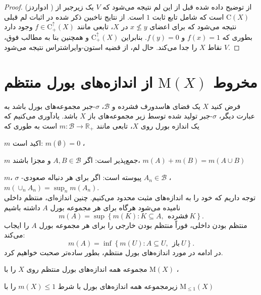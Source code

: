 \documentclass[12pt,a4paper]{article}
\theoremstyle{definition}
\theoremstyle{theorem}
\theoremstyle{definition}
\newcommand{\rM}{\mathrm{M}}
\newcommand{\rC}{\mathrm{C}}
\begin{document}
\begin{proof}
 (ادواردز%
\cite{D.A. Edwards}%
) از توضیح داده شده قبل از این لم نتیجه می‌شود که 
$ V $
یک زیرجبر از 
$ \rC(X) $
است که شامل تابع  ثابت 
$ 1 $
است. از نتایج ناخبین
 ذکر شده در اثبات لم قبلی نتیجه می‌شود که برای اعضای 
$ x\nleq y $
در
$ X $،  تابعی مانند
$ f\in \rC_{+}^{\uparrow} (X) $
وجود دارد 
بطوری که 
$ f(x)=1 $
و
$ f(y)=0$. بنابراین 
$ \rC_{+}^{\uparrow} (X) $
و همچنین بنا به مطالب فوق، 
$ V $
نقاط 
$ X $
را جدا می‌کند.  حال لم،  از قضیه استون-وایراشتراس
 نتیجه می‌شود.
\end{proof}

\section{ مخروط $\rM(X)$ از اندازه‌های بورل منتظم}\label{2} 
فرض کنید 
$ X $
یک فضای هاسدورف فشرده و
$ \mathcal{B} $، 
$ \sigma $-جبر مجموعه‌های بورل باشد به عبارت دیگر، 
$ \sigma $-جبر تولید شده توسط زیر مجموعه‌های باز 
$ X $
باشد. یادآوری می‌کنیم که یک اندازه بورل
 روی
$ X $،    تابعی مانند 
$ m:\mathcal{B} \rightarrow \mathbb{R}_{+} $
است به طوری که 

$ m $
اکید است:
$ m(\emptyset)=0 $%
،

$ m $
جمع‌پذیر است: اگر 
$ A,B\in \mathcal{B} $
و مجزا باشند،
$ m(A)+m(B)=m(A\cup B) $


$ m $،
$ \sigma $%
-پیوسته است: اگر برای هر دنباله صعودی 
$ A_{n}\in \mathcal{B}$%
،
$ m(\cup_{n} A_{n})=\sup_{n} m(A_{n}) $.\\
توجه داریم که  خود را به اندازه‌های مثبت محدود می‌کنیم.  چنین اندازه‌ای، منتظم داخلی
 نامیده می‌شود هرگاه برای هر مجموعه‌ بورل 
$ A $
داشته باشیم
$$ m(A)=\sup \left\lbrace m(K):K\subseteq A, \ \   \text{فشرده}\ K  \right\rbrace  .$$
منتظم بودن داخلی،  فوراً منتظم بودن خارجی
 را برای هر مجموعه‌ بورل
$ A $
 را ایجاب می‌کند:
$$ m(A)=\inf  \left\lbrace  m(U) : A \subseteq U, \ \ \text{باز}\ U \right\rbrace . $$
 در ادامه در مورد اندازه‌های بورل منتظم، بطور ساده‌تر صحبت خواهیم کرد.

مجموعه همه اندازه‌های بورل منتظم روی 
$ X $
را با 
$\rM(X) $\index{$ \rM(X) $}%
، 

زیرمجموعه همه اندازه‌های بورل با شرط 
$ m(X)\leq 1 $
را با 
$ \rM_{\leq 1} (X)$\index{$ \rM_{\leq 1} (X)$}
\end{document}
